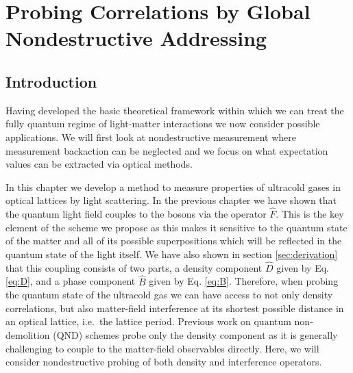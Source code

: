 
\chapter{Probing Correlations by Global 
Nondestructive Addressing} %
\label{chap:qnd}

\ifpdf
    \graphicspath{{Chapter3/Figs/Raster/}{Chapter3/Figs/PDF/}{Chapter3/Figs/}}
\else
    \graphicspath{{Chapter3/Figs/Vector/}{Chapter3/Figs/}}
\fi



\section{Introduction}

Having developed the basic theoretical framework within which we can
treat the fully quantum regime of light-matter interactions we now
consider possible applications. We will first look at nondestructive
measurement where measurement backaction can be neglected and we focus
on what expectation values can be extracted via optical methods.

In this chapter we develop a method to measure properties of ultracold
gases in optical lattices by light scattering. In the previous chapter
we have shown that the quantum light field couples to the bosons via
the operator $\hat{F}$. This is the key element of the scheme we
propose as this makes it sensitive to the quantum state of the matter
and all of its possible superpositions which will be reflected in the
quantum state of the light itself. We have also shown in section
\ref{sec:derivation} that this coupling consists of two parts, a
density component $\hat{D}$ given by Eq. \eqref{eq:D}, and a phase
component $\hat{B}$ given by Eq. \eqref{eq:B}. Therefore, when probing
the quantum state of the ultracold gas we can have access to not only
density correlations, but also matter-field interference at its
shortest possible distance in an optical lattice, i.e.~the lattice
period. Previous work on quantum non-demolition (QND) schemes
\cite{rogers2014, mekhov2007prl, eckert2008} probe only the density
component as it is generally challenging to couple to the matter-field
observables directly. Here, we will consider nondestructive probing of
both density and interference operators.

